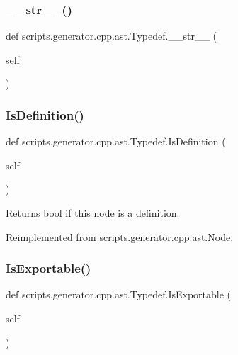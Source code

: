 \subsubsection{\texorpdfstring{\_\_str\_\_()}{\_\_str\_\_()}}
{\footnotesize\ttfamily def scripts.\+generator.\+cpp.\+ast.\+Typedef.\+\_\+\+\_\+str\+\_\+\+\_\+ (\begin{DoxyParamCaption}\item[{}]{self }\end{DoxyParamCaption})}

\mbox{\label{classscripts_1_1generator_1_1cpp_1_1ast_1_1_typedef_abec1cdfde25bcb813031bb1a44505851}} 
\subsubsection{\texorpdfstring{IsDefinition()}{IsDefinition()}}
{\footnotesize\ttfamily def scripts.\+generator.\+cpp.\+ast.\+Typedef.\+Is\+Definition (\begin{DoxyParamCaption}\item[{}]{self }\end{DoxyParamCaption})}

\begin{DoxyVerb}Returns bool if this node is a definition.\end{DoxyVerb}
 

Reimplemented from \mbox{\hyperlink{classscripts_1_1generator_1_1cpp_1_1ast_1_1_node_a53663c2acef5d6954d065e11d2fd53a1}{scripts.\+generator.\+cpp.\+ast.\+Node}}.

\mbox{\label{classscripts_1_1generator_1_1cpp_1_1ast_1_1_typedef_a6912028a648a58d9167be022b7c48874}} 
\subsubsection{\texorpdfstring{IsExportable()}{IsExportable()}}
{\footnotesize\ttfamily def scripts.\+generator.\+cpp.\+ast.\+Typedef.\+Is\+Exportable (\begin{DoxyParamCaption}\item[{}]{self }\end{DoxyParamCaption})}

